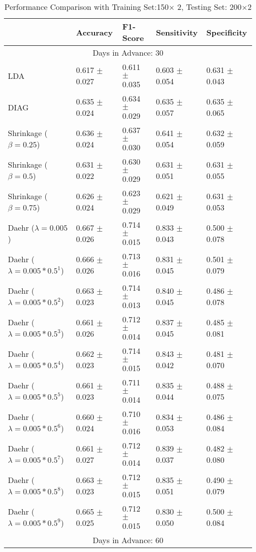 \begin{table}
\caption{Performance Comparison with Training Set:150$\times$ 2, Testing Set: 200$\times$2}
\footnotesize
\centering
\begin{tabular}{*{5}{l}}
\toprule
 & Accuracy & F1-Score & Sensitivity & Specificity\\
\hline\multicolumn{5}{c}{  Days in Advance: 30}\\\hline
LDA&0.617 $\pm$ 0.027&0.611 $\pm$ 0.035&0.603 $\pm$ 0.054&0.631 $\pm$ 0.043\\
DIAG&0.635 $\pm$ 0.024&0.634 $\pm$ 0.029&0.635 $\pm$ 0.057&0.635 $\pm$ 0.065\\
Shrinkage ($\beta=0.25$)&0.636 $\pm$ 0.024&0.637 $\pm$ 0.030&0.641 $\pm$ 0.054&0.632 $\pm$ 0.059\\
Shrinkage ($\beta=0.5$)&0.631 $\pm$ 0.022&0.630 $\pm$ 0.029&0.631 $\pm$ 0.051&0.631 $\pm$ 0.055\\
Shrinkage ($\beta=0.75$)&0.626 $\pm$ 0.024&0.623 $\pm$ 0.029&0.621 $\pm$ 0.049&0.631 $\pm$ 0.053\\
Daehr ($\lambda=0.005$)&0.667 $\pm$ 0.026&0.714 $\pm$ 0.015&0.833 $\pm$ 0.043&0.500 $\pm$ 0.078\\
Daehr ($\lambda=0.005*0.5^1$)&0.666 $\pm$ 0.026&0.713 $\pm$ 0.016&0.831 $\pm$ 0.045&0.501 $\pm$ 0.079\\
Daehr ($\lambda=0.005*0.5^2$)&0.663 $\pm$ 0.023&0.714 $\pm$ 0.013&0.840 $\pm$ 0.045&0.486 $\pm$ 0.078\\
Daehr ($\lambda=0.005*0.5^3$)&0.661 $\pm$ 0.026&0.712 $\pm$ 0.014&0.837 $\pm$ 0.045&0.485 $\pm$ 0.081\\
Daehr ($\lambda=0.005*0.5^4$)&0.662 $\pm$ 0.023&0.714 $\pm$ 0.015&0.843 $\pm$ 0.042&0.481 $\pm$ 0.070\\
Daehr ($\lambda=0.005*0.5^5$)&0.661 $\pm$ 0.023&0.711 $\pm$ 0.014&0.835 $\pm$ 0.044&0.488 $\pm$ 0.075\\
Daehr ($\lambda=0.005*0.5^6$)&0.660 $\pm$ 0.024&0.710 $\pm$ 0.016&0.834 $\pm$ 0.053&0.486 $\pm$ 0.084\\
Daehr ($\lambda=0.005*0.5^7$)&0.661 $\pm$ 0.027&0.712 $\pm$ 0.014&0.839 $\pm$ 0.037&0.482 $\pm$ 0.080\\
Daehr ($\lambda=0.005*0.5^8$)&0.663 $\pm$ 0.023&0.712 $\pm$ 0.015&0.835 $\pm$ 0.051&0.490 $\pm$ 0.079\\
Daehr ($\lambda=0.005*0.5^9$)&0.665 $\pm$ 0.025&0.712 $\pm$ 0.015&0.830 $\pm$ 0.050&0.500 $\pm$ 0.084\\
\hline\multicolumn{5}{c}{  Days in Advance: 60}\\\hline

\end{tabular}
\end{table}
